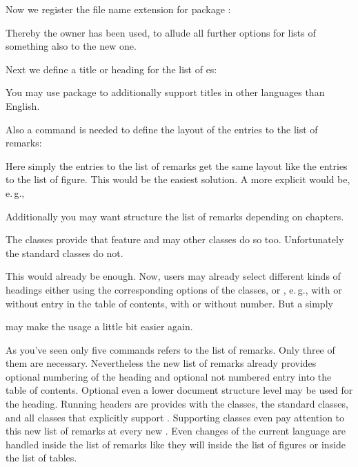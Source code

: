 Now we register the file name extension for package
:
\begin{lstcode}[belowskip=\dp\strutbox plus 1pt]
\end{lstcode}
Thereby the owner  has been used, to allude all further
\KOMAScript{} options for lists of something also to the new one.

Next we define a title or heading for the list of
es:
\begin{lstcode}[belowskip=\dp\strutbox plus 1pt]
  \newcommand*{\listoflorname}{List of Remarks}
\end{lstcode}
You may use package  to additionally support titles in other
languages than English.

Also a command is needed to define the layout of the entries
to the list of remarks:
\begin{lstcode}[belowskip=\dp\strutbox plus 1pt]
  \newcommand*{\l@remarkbox}{\l@figure}
\end{lstcode}
Here simply the entries to the list of remarks get the same layout like the
entries to the list of figure. This would be the easiest solution. A more
explicit would be, e.\,g.,
\begin{lstcode}[belowskip=\dp\strutbox plus 1pt]
  \newcommand*{\l@remarkbox}{\@dottedtocline{1}{1em}{1.5em}}
\end{lstcode}

Additionally you may want structure the list of
remarks depending on chapters.
\begin{lstcode}[belowskip=\dp\strutbox plus 1pt]
\end{lstcode}
The \KOMAScript{} classes provide that feature and may other classes do so
too. Unfortunately the standard classes do not.

This would already be enough. Now, users may already
select different kinds of headings either using the corresponding options of
the \KOMAScript{} classes, or , e.\,g., with or without entry
in the table of contents, with or without number. But a simply
\begin{lstcode}[belowskip=\dp\strutbox plus 1pt]
  \newcommand*{\listofremarkboxes}{\listoftoc{lor}}
\end{lstcode}
may make the usage a little bit easier again.

As you've seen only five commands refers to the list of remarks. Only three of
them are necessary. Nevertheless the new list of remarks already provides
optional numbering of the heading and optional not numbered entry into the
table of contents. Optional even a lower document structure level may be used
for the heading. Running headers are provides with the \KOMAScript{} classes,
the standard classes, and all classes that explicitly support
. Supporting classes even pay attention to this new list of
remarks at every new . Even changes of the current language are
handled inside the list of remarks like they will inside the list of figures
or inside the list of tables.

